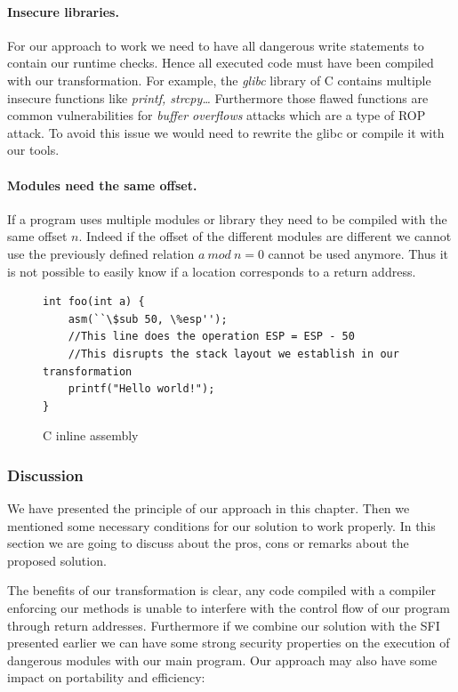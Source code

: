 \documentclass[11pt]{sdm}
\begin{document}
\paragraph{Insecure libraries.}
\label{par:Insecure libraries}

For our approach to work we need to have all dangerous write statements to contain our runtime checks. Hence all executed code must have been compiled with our transformation. For example, the \textit{glibc} library of C contains multiple insecure functions like \textit{printf, strcpy\dots} Furthermore those flawed functions are common vulnerabilities for \textit{buffer overflows} attacks which are a type of ROP attack. To avoid this issue we would need to rewrite the glibc or compile it with our tools.

\paragraph{Modules need the same offset.}
\label{par:Modules need the same offset}
If a program uses multiple modules or library they need to be compiled with the same offset $n$. Indeed if the offset of the different modules are different we cannot use the previously defined relation $a~mod~n=0$ cannot be used anymore. Thus it is not possible to easily know if a location corresponds to a return address.

\begin{figure}[!ht]
\begin{lstlisting}
int foo(int a) {
	asm(``\$sub 50, \%esp'');
	//This line does the operation ESP = ESP - 50
	//This disrupts the stack layout we establish in our transformation
	printf("Hello world!");
}
\end{lstlisting}
\centering
\caption{C inline assembly}
\label{inline_assembly}
\end{figure}

\subsubsection{Discussion}
\label{ssub:Discussion}
	We have presented the principle of our approach in this chapter. Then we mentioned some necessary conditions for our solution to work properly. In this section we are going to discuss about the pros, cons or remarks about the proposed solution.

	The benefits of our transformation is clear, any code compiled with a compiler enforcing our methods is unable to interfere with the control flow of our program through return addresses.
	Furthermore if we combine our solution with the SFI presented earlier we can have some strong security properties on the execution of dangerous modules with our main program.
Our approach may also have some impact on portability and efficiency:
\end{document}
